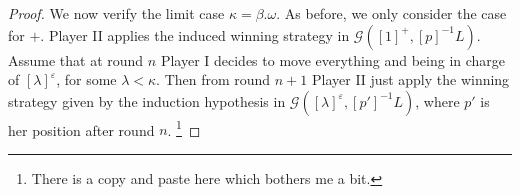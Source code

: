 \begin{proof}
We now verify the limit case $\kappa= \beta.\omega$. As before, we only consider the case for $+$. Player II applies the induced winning strategy in $\mathcal{G}([1]^+, [p]^{-1}L)$. Assume that at round $n$ Player I decides to move everything and being in charge of $[\lambda]^\varepsilon$, for some $\lambda < \kappa$. Then from round $n+1$ Player II just apply the winning strategy given by the induction hypothesis in $\mathcal{G}([\lambda]^\varepsilon, [p']^{-1}L)$, where $p'$ is her position after round $n$. \footnote{There is a copy and paste here which bothers me a bit.}
\end{proof}


